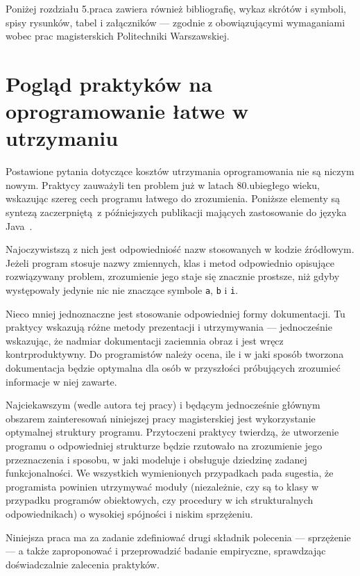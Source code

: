 Poniżej rozdziału 5.\@ praca zawiera również bibliografię, wykaz skrótów i symboli,
spisy rysunków, tabel i załączników --- zgodnie z obowiązującymi wymaganiami wobec
prac magisterskich Politechniki Warszawskiej.

\section{Pogląd praktyków na oprogramowanie łatwe w utrzymaniu}
\label{sub:practices}

Postawione pytania dotyczące kosztów utrzymania oprogramowania nie są niczym nowym.
Praktycy zauważyli ten problem już w latach 80.\@ ubiegłego wieku, wskazując
szereg cech programu łatwego do zrozumienia.
Poniższe elementy są syntezą zaczerpniętą~z późniejszych publikacji mających
zastosowanie do języka Java~\cite{martin2009clean, fowler2009, feathers2004working}.

Najoczywistszą z nich jest odpowiedniość nazw stosowanych w kodzie źródłowym.
Jeżeli program stosuje nazwy zmiennych, klas i metod odpowiednio opisujące
rozwiązywany problem, zrozumienie jego staje się znacznie prostsze, niż gdyby
występowały jedynie nic nie znaczące symbole \texttt{a}, \texttt{b} i \texttt{i}.

Nieco mniej jednoznaczne jest stosowanie odpowiedniej formy dokumentacji.
Tu praktycy wskazują różne metody prezentacji i utrzymywania --- jednocześnie
wskazując, że nadmiar dokumentacji zaciemnia obraz i jest wręcz kontrproduktywny.
Do programistów należy ocena, ile i w jaki sposób tworzona dokumentacja będzie
optymalna dla osób w przyszłości próbujących zrozumieć informacje w niej zawarte.

Najciekawszym (wedle autora tej pracy) i będącym jednocześnie głównym obszarem
zainteresowań niniejszej pracy magisterskiej jest wykorzystanie optymalnej
struktury programu.
Przytoczeni praktycy twierdzą, że utworzenie programu o odpowiedniej strukturze
będzie rzutowało na zrozumienie jego przeznaczenia i sposobu, w jaki modeluje i
obsługuje dziedzinę zadanej funkcjonalności.
We wszystkich wymienionych przypadkach pada sugestia, że programista powinien
utrzymywać moduły (niezależnie, czy są to klasy w przypadku programów obiektowych,
czy procedury w ich strukturalnych odpowiednikach) o wysokiej spójności i niskim
sprzężeniu.

Niniejsza praca ma za zadanie zdefiniować drugi składnik polecenia --- sprzężenie ---
a także zaproponować i przeprowadzić badanie empiryczne, sprawdzając doświadczalnie
zalecenia praktyków.

